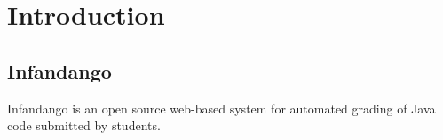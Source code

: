 \chapter{Introduction}
\section{Infandango}
Infandango is an open source web-based system for automated grading of Java code submitted by students\cite{infandango_note}.

